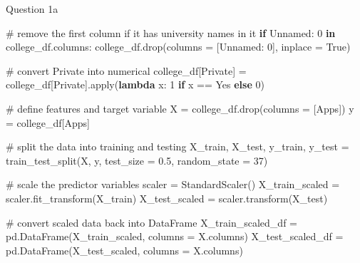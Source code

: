 \documentclass[
  letterpaper,
  DIV=11,
  numbers=noendperiod]{scrartcl}
\newenvironment{Shaded}{\begin{snugshade}}{\end{snugshade}}
\newcommand{\BuiltInTok}[1]{\textcolor[rgb]{0.00,0.23,0.31}{#1}}
\newcommand{\CommentTok}[1]{\textcolor[rgb]{0.37,0.37,0.37}{#1}}
\newcommand{\ControlFlowTok}[1]{\textcolor[rgb]{0.00,0.23,0.31}{\textbf{#1}}}
\newcommand{\DecValTok}[1]{\textcolor[rgb]{0.68,0.00,0.00}{#1}}
\newcommand{\FloatTok}[1]{\textcolor[rgb]{0.68,0.00,0.00}{#1}}
\newcommand{\KeywordTok}[1]{\textcolor[rgb]{0.00,0.23,0.31}{\textbf{#1}}}
\newcommand{\NormalTok}[1]{\textcolor[rgb]{0.00,0.23,0.31}{#1}}
\newcommand{\OperatorTok}[1]{\textcolor[rgb]{0.37,0.37,0.37}{#1}}
\newcommand{\StringTok}[1]{\textcolor[rgb]{0.13,0.47,0.30}{#1}}
\newcommand{\VariableTok}[1]{\textcolor[rgb]{0.07,0.07,0.07}{#1}}
\begin{document}
Question 1a

\begin{Shaded}
\begin{Highlighting}[]
\CommentTok{\# remove the first column if it has university names in it}
\ControlFlowTok{if} \StringTok{\textquotesingle{}Unnamed: 0\textquotesingle{}} \KeywordTok{in}\NormalTok{ college\_df.columns:}
\NormalTok{    college\_df.drop(columns }\OperatorTok{=}\NormalTok{ [}\StringTok{\textquotesingle{}Unnamed: 0\textquotesingle{}}\NormalTok{], inplace }\OperatorTok{=} \VariableTok{True}\NormalTok{)}

\CommentTok{\# convert \textquotesingle{}Private\textquotesingle{} into numerical }
\NormalTok{college\_df[}\StringTok{\textquotesingle{}Private\textquotesingle{}}\NormalTok{] }\OperatorTok{=}\NormalTok{ college\_df[}\StringTok{\textquotesingle{}Private\textquotesingle{}}\NormalTok{].}\BuiltInTok{apply}\NormalTok{(}\KeywordTok{lambda}\NormalTok{ x: }\DecValTok{1} \ControlFlowTok{if}\NormalTok{ x }\OperatorTok{==} \StringTok{\textquotesingle{}Yes\textquotesingle{}} \ControlFlowTok{else} \DecValTok{0}\NormalTok{)}

\CommentTok{\# define features and target variable}
\NormalTok{X }\OperatorTok{=}\NormalTok{ college\_df.drop(columns }\OperatorTok{=}\NormalTok{ [}\StringTok{\textquotesingle{}Apps\textquotesingle{}}\NormalTok{]) }
\NormalTok{y }\OperatorTok{=}\NormalTok{ college\_df[}\StringTok{\textquotesingle{}Apps\textquotesingle{}}\NormalTok{]}

\CommentTok{\# split the data into training and testing }
\NormalTok{X\_train, X\_test, y\_train, y\_test }\OperatorTok{=}\NormalTok{ train\_test\_split(X, y, test\_size }\OperatorTok{=} \FloatTok{0.5}\NormalTok{, random\_state }\OperatorTok{=} \DecValTok{37}\NormalTok{)}

\CommentTok{\# scale the predictor variables}
\NormalTok{scaler }\OperatorTok{=}\NormalTok{ StandardScaler()}
\NormalTok{X\_train\_scaled }\OperatorTok{=}\NormalTok{ scaler.fit\_transform(X\_train)}
\NormalTok{X\_test\_scaled }\OperatorTok{=}\NormalTok{ scaler.transform(X\_test)}

\CommentTok{\# convert scaled data back into DataFrame }
\NormalTok{X\_train\_scaled\_df }\OperatorTok{=}\NormalTok{ pd.DataFrame(X\_train\_scaled, columns }\OperatorTok{=}\NormalTok{ X.columns)}
\NormalTok{X\_test\_scaled\_df }\OperatorTok{=}\NormalTok{ pd.DataFrame(X\_test\_scaled, columns }\OperatorTok{=}\NormalTok{ X.columns)}
\end{Highlighting}
\end{Shaded}
\end{document}
